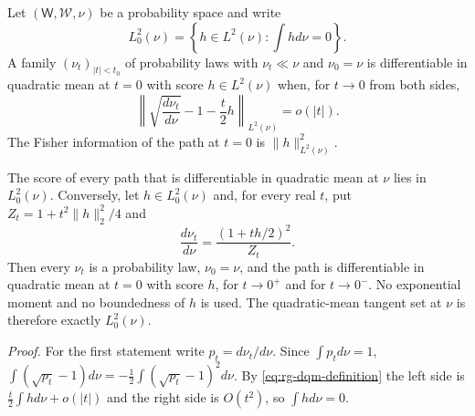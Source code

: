 Let \((\mathsf W,\mathscr W,\nu)\) be a probability space and write
\begin{equation}
L^2_0(\nu)
=\left\{h\in L^2(\nu):\int h d\nu=0\right\}.
\label{eq:rg-centered-tangent}
\end{equation}
A family \((\nu_t)_{\lvert t\rvert<t_0}\) of probability laws with
\(\nu_t\ll\nu\) and \(\nu_0=\nu\) is differentiable in quadratic mean at \(t=0\)
with score \(h\in L^2(\nu)\) when, for \(t\to0\) from both sides,
\begin{equation}
\left\lVert
\sqrt{\frac{d\nu_t}{d\nu}}-1-\frac t2h
\right\rVert_{L^2(\nu)}
=o(\lvert t\rvert).
\label{eq:rg-dqm-definition}
\end{equation}
The Fisher information of the path at \(t=0\) is \(\lVert h\rVert_{L^2(\nu)}^2\).

The score of every path that is differentiable in quadratic mean at \(\nu\) lies in
\(L^2_0(\nu)\). Conversely, let \(h\in L^2_0(\nu)\) and, for every real \(t\), put
\(Z_t=1+t^2\lVert h\rVert_2^2/4\) and
\begin{equation}
\frac{d\nu_t}{d\nu}=\frac{(1+th/2)^2}{Z_t}.
\label{eq:rg-quadratic-score-path}
\end{equation}
Then every \(\nu_t\) is a probability law, \(\nu_0=\nu\), and the path is
differentiable in quadratic mean at \(t=0\) with score \(h\), for \(t\to0^+\) and for
\(t\to0^-\). No exponential moment and no boundedness of \(h\) is used. The
quadratic-mean tangent set at \(\nu\) is therefore exactly \(L^2_0(\nu)\).

\noindent\emph{Proof.}
For the first statement write \(p_t=d\nu_t/d\nu\). Since \(\int p_td\nu=1\),
\(\int(\sqrt{p_t}-1)d\nu=-\tfrac12\int(\sqrt{p_t}-1)^2d\nu\). By
\eqref{eq:rg-dqm-definition} the left side is \(\tfrac t2\int hd\nu+o(\lvert t\rvert)\)
and the right side is \(O(t^2)\), so \(\int hd\nu=0\).

